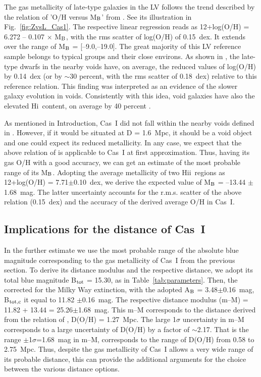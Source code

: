 \documentclass[useAMS,usenatbib]{mn2e}
\newcommand{\HI}{H{\sc i}}
\newcommand{\HII}{H{\sc ii}}
\begin{document}
The gas metallicity of late-type galaxies in the LV follows the trend
described by the relation of 'O/H versus M$_{\rm B}$' from \citet{Berg12}.
See its illustration in Fig.~\ref{fig:ZvsL_Cas1}.
The respective linear regression reads as 12+log(O/H) = 6.272 -- 0.107 $\times$ M$_{\rm B}$,
with the rms scatter of log(O/H) of 0.15~dex. It extends over the range of
M$_{\rm B}$ = [--9.0,--19.0]. The great majority of this LV reference sample
belongs to typical groups and their close environs. As shown in
\citet{PaperVII,XMP-BTA},
the late-type dwarfs in the nearby voids have, on average, the reduced
values of log(O/H) by 0.14~dex (or by $\sim$30 percent, with the
rms scatter of 0.18~dex) relative to this reference relation. This
finding was interpreted as an evidence of the slower galaxy  evolution
in voids. Consistently with this idea, void galaxies have also
the elevated \HI\ content, on average by 40 percent \citep{PaperVI}.

As mentioned in Introduction,  Cas~I did not fall within the nearby voids defined in \citet{PTM19}.
However, if it would be situated at D = 1.6~Mpc, it should be a void object and one could expect its reduced metallicity.
In any case, we expect that the above relation of \citet{Berg12} is applicable
to Cas~I at first approximation. Thus, having its gas O/H with a good accuracy, we can get an estimate
of the most probable range of its M$_{\rm B}$.
Adopting the average metallicity of two \HII\ regions as 12+log(O/H) = 7.71$\pm$0.10~dex,
we derive the expected value of M$_{\rm B}$ = --13.44 $\pm$ 1.68~mag.
The latter uncertainty accounts for the r.m.s. scatter of the above \citet{Berg12}
relation (0.15~dex) and the accuracy of the derived average O/H in Cas~I.

\subsection{Implications for the distance of Cas~I}
\label{ssec:distance}

In the further estimate we use the most probable range of the absolute blue magnitude corresponding
to the gas metallicity of Cas~I from the previous section. To derive its distance modulus and the
respective distance, we adopt its total blue magnitude B$_{\rm tot}$ = 15.30,
as in Table~\ref{tab:parameters}. Then, the corrected for the Milky Way extinction, with the adopted
A$_{\rm B}$ = 3.48$\pm$0.16~mag, B$_{\rm tot,c}$ it equal to 11.82 $\pm$0.16~mag.
The respective distance modulus (m--M) = 11.82 + 13.44  = 25.26$\pm$1.68~mag.
This m--M corresponds to the distance derived from the relation of \citet{Berg12}, D(O/H) = 1.27~Mpc. The large
1$\sigma$ uncertainty in m--M corresponds to a large uncertainty of D(O/H) by a factor of $\sim$2.17.
That is the range $\pm$1$\sigma$=1.68~mag in m--M, corresponds to the range of D(O/H) from 0.58 to 2.75~Mpc.
Thus, despite the gas metallicity of Cas~I allows a very wide range of its probable distance, this can provide
the additional arguments for the choice between the various distance options.
\end{document}
